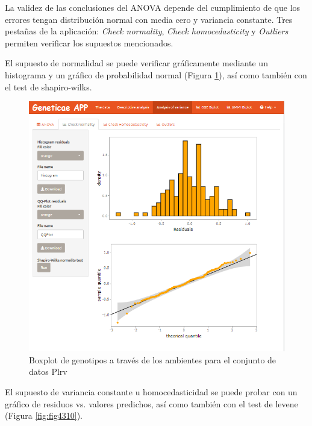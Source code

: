 La validez de las conclusiones del ANOVA depende del cumplimiento de que los errores tengan distribución normal con media cero y variancia constante. Tres pestañas de la aplicación: \emph{Check normality}, \emph{Check homocedasticity} y \emph{Outliers} permiten verificar los supuestos mencionados.

El supuesto de normalidad se puede verificar gráficamente mediante un histograma y un gráfico de probabilidad normal (Figura \ref{fig:fig439}), así como también con el test de shapiro-wilks.

\begin{figure}[H]
	\begin{center}
		\includegraphics[width=16cm]{./Graficos/Normalidad.png}
	\end{center}
	\caption{Boxplot de genotipos a través de los ambientes para el conjunto de datos Plrv}
	\label{fig:fig439}
\end{figure}


El supuesto de variancia constante u homocedasticidad se puede probar con un gráfico de residuos vs. valores predichos, así como también con el test de levene (Figura \ref{fig:fig4310}). 

